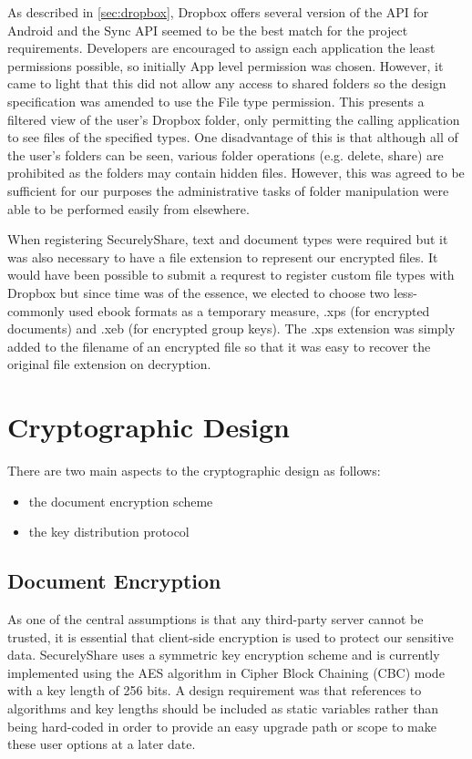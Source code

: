 As described in \ref{sec:dropbox}, Dropbox offers several version of the API for Android and the Sync API seemed to be the best match for the project requirements.  Developers are encouraged to assign each application the least permissions possible, so initially App level permission was chosen.  However, it came to light that this did not allow any access to shared folders so the design specification was amended to use the File type permission.  This presents a filtered view of the user's Dropbox folder, only permitting the calling application to see files of the specified types.  One disadvantage of this is that although all of the user's folders can be seen, various folder operations (e.g. delete, share) are prohibited as the folders may contain hidden files.  However, this was agreed to be sufficient for our purposes the administrative tasks of folder manipulation were able to be performed easily from elsewhere.   

When registering SecurelyShare, text and document types were required but it was also necessary to have a file extension to represent our encrypted files.  It would have been possible to submit a requrest to register custom file types with Dropbox but since time was of the essence, we elected to choose two less-commonly used ebook formats as a temporary measure, .xps (for encrypted documents) and .xeb (for encrypted group keys).  The .xps extension was simply added to the filename of an encrypted file so that it was easy to recover the original file extension on decryption.

\section{Cryptographic Design}
\label{sec:crypto}

There are two main aspects to the cryptographic design as follows:
\begin{itemize}
\item the document encryption scheme
\item the key distribution protocol
\end{itemize} 
\subsection*{Document Encryption}
As one of the central assumptions is that any third-party server cannot be trusted, it is essential that client-side encryption is used to protect our sensitive data.  SecurelyShare uses a symmetric key encryption scheme and is currently implemented using the AES algorithm in Cipher Block Chaining (CBC) mode with a key length of 256 bits.  A design requirement was that references to algorithms and key lengths should be included as static variables rather than being hard-coded in order to provide an easy upgrade path or scope to make these user options at a later date.
